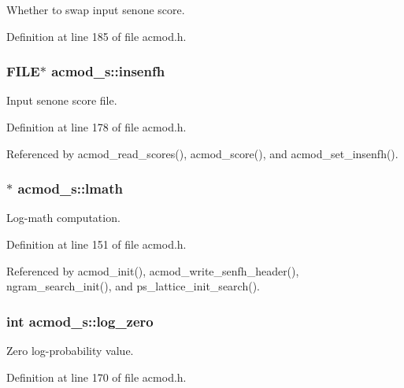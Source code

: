 \-Whether to swap input senone score. 



\-Definition at line 185 of file acmod.\-h.

\subsubsection[{insenfh}]{\setlength{\rightskip}{0pt plus 5cm}\-F\-I\-L\-E$\ast$ {\bf acmod\-\_\-s\-::insenfh}}\label{structacmod__s_ad0998a9d887db82bd684e9454c9b044e}


\-Input senone score file. 



\-Definition at line 178 of file acmod.\-h.



\-Referenced by acmod\-\_\-read\-\_\-scores(), acmod\-\_\-score(), and acmod\-\_\-set\-\_\-insenfh().

\subsubsection[{lmath}]{$\ast$ {\bf acmod\-\_\-s\-::lmath}}\label{structacmod__s_a9de7e8ac9c0c4df3d2a9ad5406787f3c}


\-Log-\/math computation. 



\-Definition at line 151 of file acmod.\-h.



\-Referenced by acmod\-\_\-init(), acmod\-\_\-write\-\_\-senfh\-\_\-header(), ngram\-\_\-search\-\_\-init(), and ps\-\_\-lattice\-\_\-init\-\_\-search().

\subsubsection[{log\-\_\-zero}]{\setlength{\rightskip}{0pt plus 5cm}int {\bf acmod\-\_\-s\-::log\-\_\-zero}}\label{structacmod__s_a95d5195647b6395d95433d45e3f74d51}


\-Zero log-\/probability value. 



\-Definition at line 170 of file acmod.\-h.



